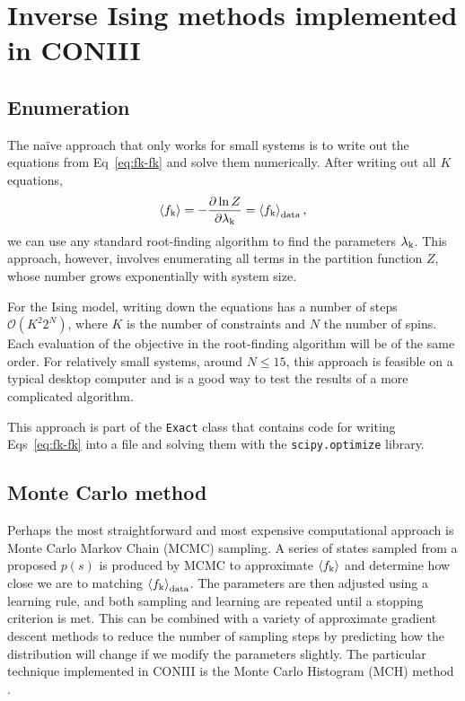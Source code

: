 \documentclass[aps,prl,twocolumn,nofootinbib]{revtex4-1}
\begin{document}
\section{Inverse Ising methods implemented in CONIII}


\subsection{Enumeration}
The na\"{i}ve approach that only works for small systems is to write out the equations from Eq~\ref{eq:fk-fk} and solve them numerically. After writing out all $K$ equations,
\begin{equation}
	\left<f_{\rm k}\right> = -\frac{\partial \ln Z}{\partial \lambda_{\rm k}} = \left<f_{\rm k}\right>_{\rm data} \\,
\end{equation}
we can use any standard root-finding algorithm to find the parameters $\lambda_{\rm k}$.
This approach, however, involves enumerating all terms in the partition function $Z$, whose number grows exponentially with system size.

For the Ising model, writing down the equations has a number of steps $\mathcal{O}(K^2 2^{N})$, where $K$ is the number of constraints and $N$ the number of spins.  Each evaluation of the objective in the root-finding algorithm will be of the same order. For relatively small systems, around $N\leq15$, this approach is feasible on a typical desktop computer and is a good way to test the results of a more complicated algorithm.

This approach is part of the {\tt Exact} class that contains code for writing Eqs~\ref{eq:fk-fk} into a file and solving them with the {\tt scipy.optimize} library.


\subsection{Monte Carlo method}
Perhaps the most straightforward and most expensive computational approach is Monte Carlo Markov Chain (MCMC) sampling.  A series of states sampled from a proposed $p(s)$ is produced by MCMC to approximate $\left<f_{\rm k}\right>$ and determine how close we are to matching $\left<f_{\rm k}\right>_{\rm data}$.  The parameters are then adjusted using a learning rule, and both sampling and learning are repeated until a stopping criterion is met.
This can be combined with a variety of approximate gradient descent methods to reduce the number of sampling steps by predicting how the distribution will change if we modify the parameters slightly.
The particular technique implemented in CONIII is the Monte Carlo Histogram (MCH) method \cite{Broderick:2007wq}.
\end{document}
